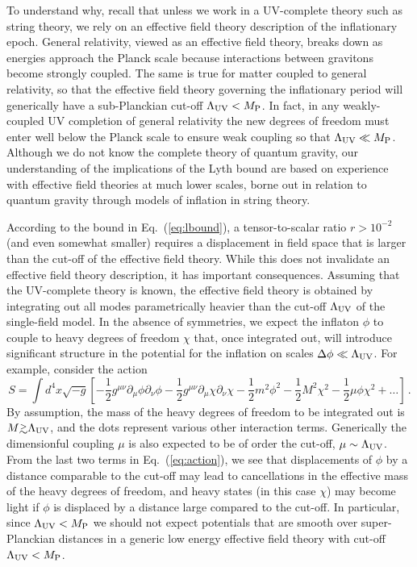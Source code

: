 To understand why, recall that unless we work in a UV-complete theory such as string theory, we rely on an effective field theory description of the inflationary epoch. General relativity, viewed as an effective field theory, breaks down as energies approach the Planck scale because interactions between gravitons become strongly coupled. The same is true for matter coupled to general relativity, so that the effective field theory governing the inflationary period will generically have a sub-Planckian cut-off $\Lambda_{\rm UV}<M_{\rm P}$. In fact, in any weakly-coupled UV completion of general relativity the new degrees of freedom must enter well below the Planck scale to ensure weak coupling so that $\Lambda_{\rm UV}\ll M_{\rm P}$. Although we do not know the complete theory of quantum gravity, our understanding of the implications of the Lyth bound are based on experience with effective field theories at much lower scales, borne out in relation to quantum gravity through models of inflation in string theory.

According to the bound in Eq.~(\ref{eq:lbound}), a tensor-to-scalar ratio $r>10^{-2}$ (and even somewhat smaller) requires a displacement in field space that is larger than the cut-off of the effective field theory. While this does not invalidate an effective field theory description, it has important consequences. Assuming that the UV-complete theory is known, the effective field theory is obtained by integrating out all modes parametrically heavier than the cut-off $\Lambda_{\rm UV}$ of the single-field model. In the absence of symmetries, we expect the inflaton $\phi$ to couple to heavy degrees of freedom $\chi$ that, once integrated out, will introduce significant structure in the potential for the inflation on scales $\Delta\phi\ll \Lambda_{\rm UV}$. For example, consider the action
\begin{equation}\label{eq:action}
S=\int d^4x\sqrt{-g}\left[-\frac12g^{\mu\nu}\partial_\mu\phi\partial_\nu\phi-\frac12g^{\mu\nu}\partial_\mu\chi\partial_\nu\chi-\frac12m^2\phi^2-\frac12M^2\chi^2-\frac12\mu\phi\chi^2+\dots\right]\,.
\end{equation}
By assumption, the mass of the heavy degrees of freedom to be integrated out is $M\gtrsim\Lambda_{\rm UV}$, and the dots represent various other interaction terms. Generically the dimensionful coupling $\mu$ is also expected to be of order the cut-off, $\mu\sim\Lambda_{\rm UV}$. From the last two terms in Eq.~(\ref{eq:action}), we see that displacements of $\phi$ by a distance comparable to the cut-off may lead to cancellations in the effective mass of the heavy degrees of freedom, and heavy states (in this case $\chi$) may become light if $\phi$ is displaced by a distance large compared to the cut-off. In particular, since $\Lambda_{\rm UV}<M_{\rm P}$ we should not expect potentials that are smooth over super-Planckian distances in a generic low energy effective field theory with cut-off $\Lambda_{\rm UV}<M_{\rm P}$. 

